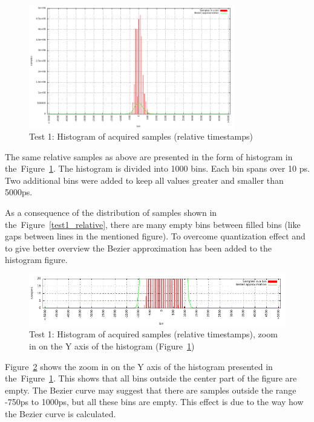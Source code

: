 \documentclass[a4paper, 12pt]{article}
\begin{document}
\begin{figure}[ht!]
  \centering
  \includegraphics[width=0.80\textwidth]{img/test1_histogram.pdf}
  \caption{Test 1: Histogram of acquired samples (relative timestamps)}
  \label{test1_histogram}
\end{figure}

The same relative samples as above are
presented in the form of histogram in the~Figure~\ref{test1_histogram}.
The histogram is divided into 1000 bins.
Each bin spans over 10 ps.
Two additional bins were added to keep all values greater and smaller than
5000ps.

As a consequence of the distribution of samples shown in
the~Figure~\ref{test1_relative}, there are many empty bins between filled bins
(like gaps between lines in the mentioned figure).
To overcome quantization effect and to give better overview
the Bezier approximation has been added to the histogram figure.

\begin{figure}[ht!]
  \centering
  \includegraphics[width=1\textwidth]{img/test1_histogram_zoomy.pdf}
  \caption{Test 1: Histogram of acquired samples (relative timestamps),
           zoom in on the Y axis of the histogram (Figure~\ref{test1_histogram})}
  \label{test1_histogram_zoomy}
\end{figure}

Figure~\ref{test1_histogram_zoomy} shows the zoom in on the Y axis of the histogram
presented in the~Figure~\ref{test1_histogram}. This shows that all bins outside
the center part of the figure are empty.
The Bezier curve may suggest that there are samples outside the range
-750ps to 1000ps, but all these bins are empty.
This effect is due to the way how the Bezier curve is calculated.
\end{document}
